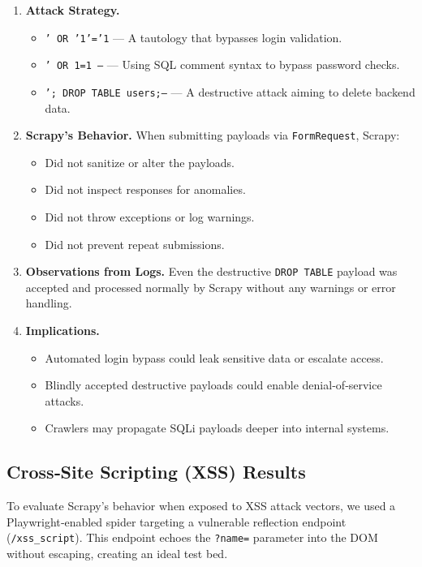 \begin{enumerate}[label=\alph*)]
  \item \textbf{Attack Strategy.}
    \begin{itemize}[topsep=0pt,itemsep=2pt]
      \item \texttt{' OR '1'='1} — A tautology that bypasses login validation.
      \item \texttt{' OR 1=1 --} — Using SQL comment syntax to bypass password checks.
      \item \texttt{'; DROP TABLE users;--} — A destructive attack aiming to delete backend data.
    \end{itemize}

  \item \textbf{Scrapy’s Behavior.} When submitting payloads via \texttt{FormRequest}, Scrapy:
    \begin{itemize}[topsep=0pt,itemsep=2pt]
      \item Did not sanitize or alter the payloads.
      \item Did not inspect responses for anomalies.
      \item Did not throw exceptions or log warnings.
      \item Did not prevent repeat submissions.
    \end{itemize}

  \item \textbf{Observations from Logs.}  
    Even the destructive \texttt{DROP TABLE} payload was accepted and processed normally by Scrapy without any warnings or error handling.

  \item \textbf{Implications.}
    \begin{itemize}[topsep=0pt,itemsep=2pt]
      \item Automated login bypass could leak sensitive data or escalate access.
      \item Blindly accepted destructive payloads could enable denial‐of‐service attacks.
      \item Crawlers may propagate SQLi payloads deeper into internal systems.
    \end{itemize}
\end{enumerate}

\subsection{Cross‐Site Scripting (XSS) Results}
To evaluate Scrapy’s behavior when exposed to XSS attack vectors, we used a Playwright‐enabled spider targeting a vulnerable reflection endpoint (\texttt{/xss\_script}). This endpoint echoes the \texttt{?name=} parameter into the DOM without escaping, creating an ideal test bed.

